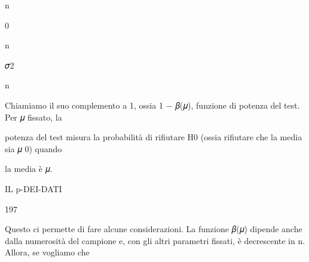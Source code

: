 \documentclass[a4paper,portrait,12pt]{article}
\begin{document}
\begin{flushleft}
n
\end{flushleft}





0





\begin{flushleft}
n
\end{flushleft}





\begin{flushleft}
𝜎2
\end{flushleft}





\begin{flushleft}
n
\end{flushleft}





\begin{flushleft}
Chiamiamo il suo complemento a 1, ossia 1 $-$ 𝛽(𝜇), funzione di potenza del test. Per 𝜇 fissato, la
\end{flushleft}


\begin{flushleft}
potenza del test misura la probabilit\`{a} di rifiutare H0 (ossia rifiutare che la media sia 𝜇 0) quando
\end{flushleft}


\begin{flushleft}
la media \`{e} 𝜇.
\end{flushleft}





\begin{flushleft}
 IL p-DEI-DATI
\end{flushleft}





197





\begin{flushleft}
Questo ci permette di fare alcune considerazioni. La funzione 𝛽(𝜇) dipende anche dalla numerosit\`{a} del campione e, con gli altri parametri fissati, \`{e} decrescente in n. Allora, se vogliamo che
\end{flushleft}
\end{document}
